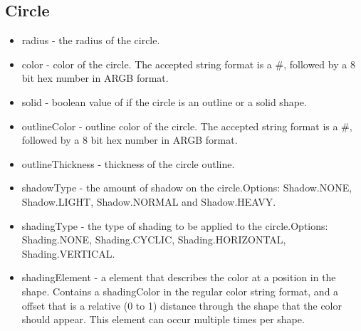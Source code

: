 \documentclass{article}
\begin{document}
\subsection{Circle}
\begin{itemize}
\item radius - the radius of the circle.
\item color - color of the circle. The accepted string format is a \#, followed by a 8 bit hex number in ARGB format.
\item solid - boolean value of if the circle is an outline or a solid shape.
\item outlineColor - outline color of the circle. The accepted string format is a \#, followed by a 8 bit hex number in ARGB format.
\item outlineThickness - thickness of the circle outline.
\item shadowType - the amount of shadow on the circle.\newline  Options: Shadow.NONE, Shadow.LIGHT, Shadow.NORMAL and Shadow.HEAVY.
\item shadingType - the type of shading to be applied to the circle.\newline  Options: Shading.NONE, Shading.CYCLIC, Shading.HORIZONTAL, Shading.VERTICAL.
\item shadingElement - a element that describes the color at a position in the shape. Contains a shadingColor in the regular color string format, and a offset that is a relative (0 to 1) distance through the shape that the color should appear. This element can occur multiple times per shape.
\end{itemize}
\end{document}
